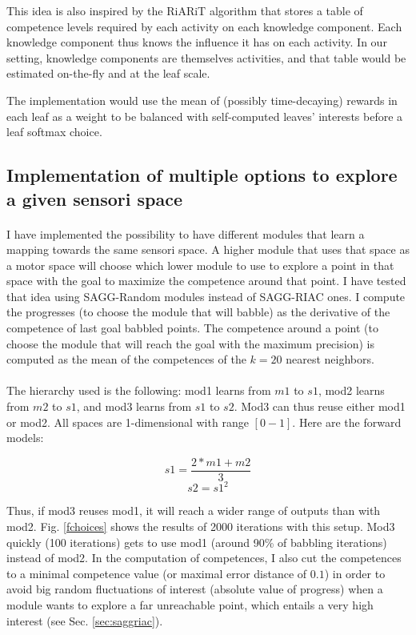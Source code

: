 \documentclass[12pt]{article}
\begin{document}
		This idea is also inspired by the RiARiT algorithm that stores a table of competence levels required by each activity on each knowledge component.
		Each knowledge component thus knows the influence it has on each activity.
		In our setting, knowledge components are themselves activities, and that table would be estimated on-the-fly and at the leaf scale.
		
		The implementation would use the mean of (possibly time-decaying) rewards in each leaf as a weight to be balanced with self-computed leaves' interests before a leaf softmax choice.
		
		
		
		
	
		
	\subsection{Implementation of multiple options to explore a given sensori space}
	\label{choices}
		
		\paragraph{}
		I have implemented the possibility to have different modules that learn a mapping towards the same sensori space.
		A higher module that uses that space as a motor space will choose which lower module to use to explore a point in that space with the goal to maximize the competence around that point.
		I have tested that idea using SAGG-Random modules instead of SAGG-RIAC ones.
		I compute the progresses (to choose the module that will babble) as the derivative of the competence of last goal babbled points.
		The competence around a point (to choose the module that will reach the goal with the maximum precision) is computed as the mean of the competences of the $k=20$ nearest neighbors.
		
		\paragraph{}
		The hierarchy used is the following: mod1 learns from $m1$ to $s1$, mod2 learns from $m2$ to $s1$, and mod3 learns from $s1$ to $s2$.
		Mod3 can thus reuse either mod1 or mod2. All spaces are 1-dimensional with range $[0-1]$. Here are the forward models:
		
		$$s1 = \frac{2*m1 + m2}{3}$$
		$$s2 = s1^2$$
		
		Thus, if mod3 reuses mod1, it will reach a wider range of outputs than with mod2. Fig. \ref{fchoices} shows the results of 2000 iterations with this setup.
		Mod3 quickly (100 iterations) gets to use mod1 (around 90\% of babbling iterations) instead of mod2.
		In the computation of competences, I also cut the competences to a minimal competence value (or maximal error distance of $0.1$) in order to avoid big random fluctuations of interest (absolute value of progress) 
		when a module wants to explore a far unreachable point, which entails a very high interest (see Sec. \ref{sec:saggriac}).
		
\end{document}
